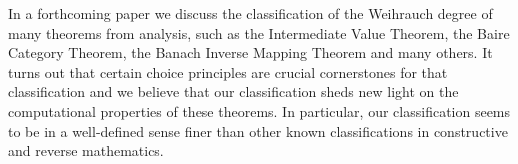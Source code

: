 \documentclass[jsl,10pt]{noasl}
\def\LLPO{\text{\rm\sffamily LLPO}}
\def\LLPO{\text{\rm\sffamily LLPO}}
\begin{document}
In a forthcoming paper \cite{BG09b} we discuss the classification of the 
Weihrauch degree of many theorems
from analysis, such as the Intermediate Value Theorem, the Baire Category Theorem,
the Banach Inverse Mapping Theorem and many others.
It turns out that certain choice principles are crucial cornerstones for
that classification and we believe that our classification sheds new
light on the computational properties of these theorems.
In particular, our classification seems to be in a well-defined sense finer 
than other known classifications in constructive and reverse mathematics.

%
%
%
%
%
%




\end{document}
